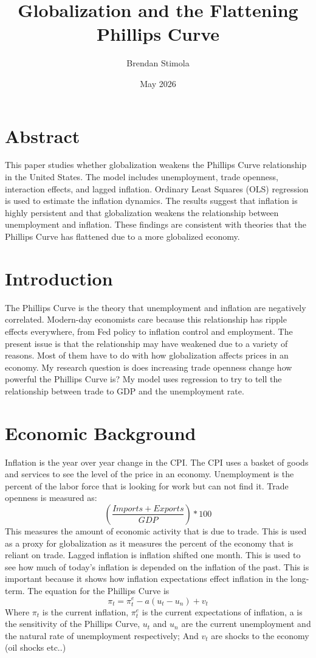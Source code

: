 \documentclass{article}
\title{Globalization and the Flattening Phillips Curve}
\author{Brendan Stimola}
\date{May 2026}
\begin{document}
\maketitle

\section{Abstract}

This paper studies whether globalization weakens the Phillips Curve relationship in the United States. The model includes unemployment, trade openness, interaction effects, and lagged inflation. Ordinary Least Squares (OLS) regression is used to estimate the inflation dynamics. The results suggest that inflation is highly persistent and that globalization weakens the relationship between unemployment and inflation. These findings are consistent with theories that the Phillips Curve has flattened due to a more globalized economy.

\section{Introduction}

The Phillips Curve is the theory that unemployment and inflation are negatively correlated. Modern-day economists care because this relationship has ripple effects everywhere, from Fed policy to inflation control and employment. The present issue is that the relationship may have weakened due to a variety of reasons. Most of them have to do with how globalization affects prices in an economy. My research question is does increasing trade openness change how powerful the Phillips Curve is? My model uses regression to try to tell the relationship between trade to GDP and the unemployment rate.

\section{Economic Background}

Inflation is the year over year change in the CPI. The CPI uses a basket of goods and services to see the level of the price in an economy. Unemployment is the percent of the labor force that is looking for work but can not find it. Trade openness is measured as:
$$(\frac{Imports+Exports}{GDP})*100$$
This measures the amount of economic activity that is due to trade. This is used as a proxy for globalization as it measures the percent of the economy that is reliant on trade. Lagged inflation is inflation shifted one month. This is used to see how much of today's inflation is depended on the inflation of the past. This is important because it shows how inflation expectations effect inflation in the long-term. The equation for the Phillips Curve is 
$$
\pi_t=\pi^e_t-a(u_t-u_n)+v_t
$$
Where $\pi_t$ is the current inflation, $\pi^e_t$ is the current expectations of inflation, a is the sensitivity of the Phillips Curve, $u_t$ and $u_n$ are the current unemployment and the natural rate of unemployment respectively; And $v_t$ are shocks to the economy (oil shocks etc..)
\end{document}
